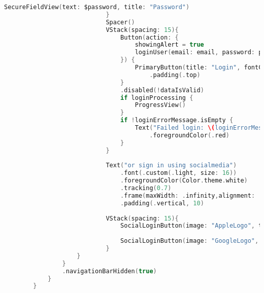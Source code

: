 \begin{minipage}{\textwidth}
\begin{lstlisting}[language=swift]
                                SecureFieldView(text: $password, title: "Password")
                            }
                            Spacer()
                            VStack(spacing: 15){
                                Button(action: {
                                    showingAlert = true
                                    loginUser(email: email, password: password)
                                }) {
                                    PrimaryButton(title: "Login", fontColor: Color.theme.white, backgroundColor: buttonColor)
                                        .padding(.top)
                                }
                                .disabled(!dataIsValid)
                                if loginProcessing {
                                    ProgressView()
                                }
                                if !loginErrorMessage.isEmpty {
                                    Text("Failed login: \(loginErrorMessage)")
                                        .foregroundColor(.red)
                                }
                            }
                            
                            Text("or sign in using socialmedia")
                                .font(.custom(.light, size: 16))
                                .foregroundColor(Color.theme.white)
                                .tracking(0.7)
                                .frame(maxWidth: .infinity,alignment: .center)
                                .padding(.vertical, 10)
                            
                            VStack(spacing: 15){
                                SocialLoginButton(image: "AppleLogo", text: "Sing in with AppleID")
                                    
                                SocialLoginButton(image: "GoogleLogo", text: "Sign in with Google")
                            }
                    }
                }
                .navigationBarHidden(true)      
            }
        }
                
    \end{lstlisting}   
\end{minipage}

